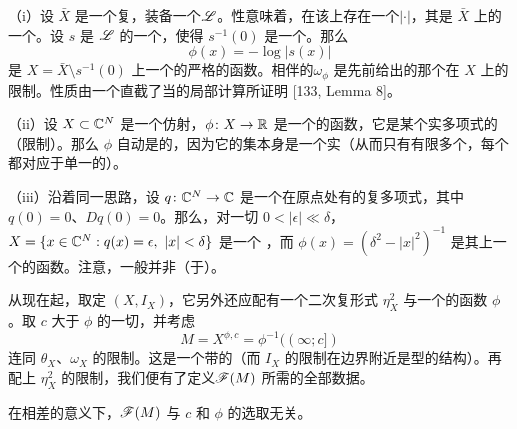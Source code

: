 \begin{example}\label{thm:plurisubharmonic-examples}
（i）设 $\bar{X}$ 是一个\trSmooth{}复\trProjectiveVariety，装备一个\trAmple{}\trLineBundle{}$\mathscr{L}$。\trAmple{}性意味着，在该\trLineBundle{}上存在一个\trMetric{}$|\cdot|$，其\trCurvature{}是 $\bar{X}$ 上的一个\trKaehler{}\trForm。设 $s$ 是 $\mathscr{L}$ 的一个\trHolomorphic{}\trSection，使得 $s^{-1}(0)$ 是一个\trNormalCrossings{}\trDivisor。那么
\begin{equation*}
\phi(x)=-\log|s(x)|
\end{equation*}
是 $X=\bar{X}\setminus s^{-1}(0)$ 上一个\trExhausting{}的严格\trPlurisubharmonic{}的\trFiniteType{}函数。相伴的\trKaehler{}\trForm{}$\omega_\phi$ 是先前给出的那个\trKaehler{}\trForm{}在 $X$ 上的限制。\trFiniteType{}性质由一个直截了当的局部计算所证明 [133, Lemma 8]。

（ii）设 $X\subset\mathbb{C}^N$ 是一个\trSmooth{}仿射\trAlgebraicVariety，$\phi\colon X\to\mathbb{R}$ 是一个\trExhausting{}的\trPlurisubharmonic{}函数，它是某个实多项式的（限制）。那么 $\phi$ 自动是\trFiniteType{}的，因为它的\trCriticalPoint{}集本身是一个实\trAlgebraicVariety（从而只有有限多个\trConnectedComponent，每个都对应于单一的\trCriticalValue）。

（iii）沿着同一思路，设 $q\colon\mathbb{C}^N\to\mathbb{C}$ 是一个在原点处有\trIsolated{}\trCriticalPoint{}的复多项式，其中 $q(0)=0$、$Dq(0)=0$。那么，对一切 $0<|\epsilon|\ll\delta$，\trMilnorFibre
$X=\{x\in\CC^N: q(x)=\epsilon,\ |x|<\delta\}$ 是一个 \trStein{}\trManifold，而 $\phi(x)=(\delta^2-|x|^2)^{-1}$ 是其上一个\trFiniteType{}的\trPlurisubharmonic{}函数。注意，\trMilnorFibre{}一般并非（\trBiholomorphic{}于）\trAlgebraicVariety。
\end{example}
从现在起，取定 $(X,I_X)$，它另外还应配有一个二次复\trVolume{}形式 $\eta_X^2$ 与一个\trFiniteType{}的\trExhausting{}\trPlurisubharmonic{}函数 $\phi$。取 $c$ 大于 $\phi$ 的一切\trCriticalValue，并考虑\trSublevelSet
\begin{equation*}
M=X^{\phi,c}=\phi^{-1}((\infty;c])
\end{equation*}
连同 $\theta_X$、$\omega_X$ 的限制。这是一个带\trContactTypeBoundary{}的\trExactSymplectic\trManifold（而 $I_X$ 的限制在边界附近是\trContact{}型的\trAlmostComplex{}结构）。再配上 $\eta_X^2$ 的限制，我们便有了定义\trFukayaCategory{}$\mathscr{F}(M)$ 所需的全部数据。
\begin{proposition}\label{thm:fukaya-category-independent}
在相差\trQuasiequivalence{}的意义下，$\mathscr{F}(M)$ 与 $c$ 和 $\phi$ 的选取无关。
\end{proposition}
